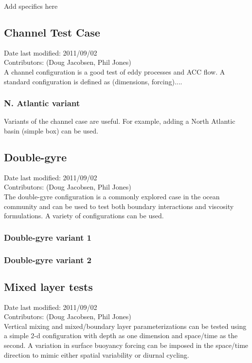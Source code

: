 \documentclass[11pt]{report}
\begin{document}
Add specifics here

\subsection{Channel Test Case}
Date last modified: 2011/09/02 \\
Contributors: (Doug Jacobsen, Phil Jones) \\

A channel configuration is a good test of eddy processes and ACC flow.  
A standard configuration is defined as (dimensions, forcing)....   
 
\subsubsection{N. Atlantic variant}

Variants of the channel case are useful.  For example, adding
a North Atlantic basin (simple box) can be used.

\subsection{Double-gyre}
Date last modified: 2011/09/02 \\
Contributors: (Doug Jacobsen, Phil Jones) \\

The double-gyre configuration is a commonly explored case in the
ocean community and can be used to test both boundary interactions
and viscosity formulations.  A variety of configurations can be
used.

\subsubsection{Double-gyre variant 1}
\subsubsection{Double-gyre variant 2}

\subsection{Mixed layer tests}
Date last modified: 2011/09/02 \\
Contributors: (Doug Jacobsen, Phil Jones) \\

Vertical mixing and mixed/boundary layer parameterizations can be
tested using a simple 2-d configuration with depth as one dimension
and space/time as the second.  A variation in surface buoyancy 
forcing can be imposed in the space/time direction to mimic either
spatial variability or diurnal cycling.  
\end{document}
